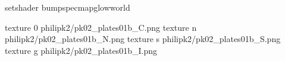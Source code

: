 setshader bumpspecmapglowworld

texture 0 philipk2/pk02_plates01b_C.png
texture n philipk2/pk02_plates01b_N.png
texture s philipk2/pk02_plates01b_S.png
texture g philipk2/pk02_plates01b_I.png
